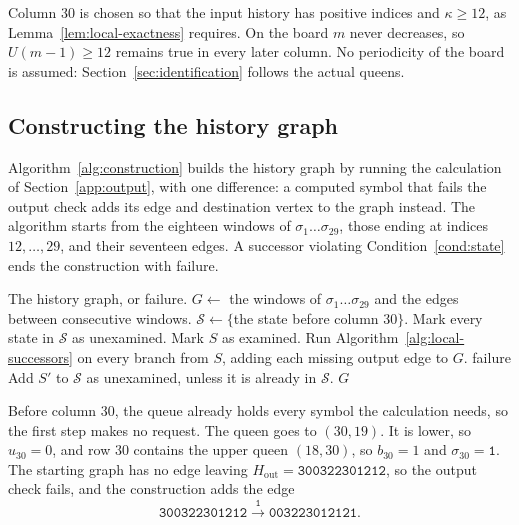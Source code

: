 Column $30$ is chosen so that the input history has positive
indices and $\kappa\ge12$, as Lemma~\ref{lem:local-exactness}
requires. On the board $m$ never decreases, so $U(m-1)\ge12$
remains true in every later column. No periodicity of the board is
assumed: Section~\ref{sec:identification} follows the actual queens.

\newpage
\subsection{Constructing the history graph}\label{sec:finite-statement}

Algorithm~\ref{alg:construction} builds the history graph by running
the calculation of Section~\ref{app:output}, with one difference: a computed symbol that fails the
output check adds its edge and destination vertex to the graph
instead. The algorithm starts from the eighteen windows of
$\sigma_1\dots\sigma_{29}$, those ending at indices $12,\dots,29$, and
their seventeen edges. A successor violating
Condition~\ref{cond:state} ends the construction with failure.

\begin{algorithm}[H]
\caption{Constructing the history graph}
\label{alg:construction}
\renewcommand{\algorithmicensure}{\textbf{Output:}}
\begin{algorithmic}[1]
\Ensure The history graph, or failure.
\State $G\gets$ the windows of $\sigma_1\dots\sigma_{29}$ and the edges between consecutive windows.
\State $\mathcal S\gets\{$the state before column $30\}$.
\Repeat{}
  \State Mark every state in $\mathcal S$ as unexamined.
    \State Mark $S$ as examined.
    \State Run Algorithm~\ref{alg:local-successors} on every branch from $S$, adding each missing output edge to $G$.
        \State \Return failure
      \EndIf
      \State Add $S'$ to $\mathcal S$ as unexamined, unless it is already in $\mathcal S$.
    \EndFor
  \EndWhile
{}
\State \Return $G$
\end{algorithmic}
\end{algorithm}

Before column $30$, the queue already holds every symbol the
calculation needs, so the first step makes no request. The queen goes
to $(30,19)$. It is lower, so $u_{30}=0$, and row $30$ contains the
upper queen $(18,30)$, so $b_{30}=1$ and $\sigma_{30}=\mathtt{1}$. The
starting graph has no edge leaving
$H_{\mathrm{out}}=\texttt{300322301212}$, so the output check fails,
and the construction adds the edge
\[
 \texttt{300322301212}\xrightarrow{\;\texttt{1}\;}
 \texttt{003223012121}.
\]


